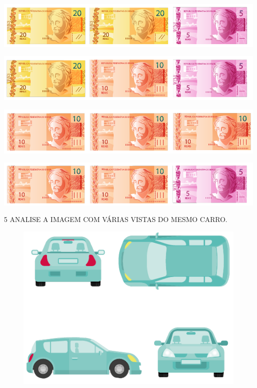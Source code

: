 \begin{escolha}
\item \includegraphics[width=\textwidth]{./media/SAEB_1ANO_MAT_FIGURA129a.png}
\item \includegraphics[width=\textwidth]{./media/SAEB_1ANO_MAT_FIGURA129b.png}
\item \includegraphics[width=\textwidth]{./media/SAEB_1ANO_MAT_FIGURA129c.png}
\item \includegraphics[width=\textwidth]{./media/SAEB_1ANO_MAT_FIGURA129d.png}
\end{escolha}

\num{5} ANALISE A IMAGEM COM VÁRIAS VISTAS DO MESMO CARRO.



\begin{figure}[H]
\centering
\includegraphics[width=.6\textwidth]{./media/SAEB_1ANO_MAT_FIGURA130.png}
\end{figure}

